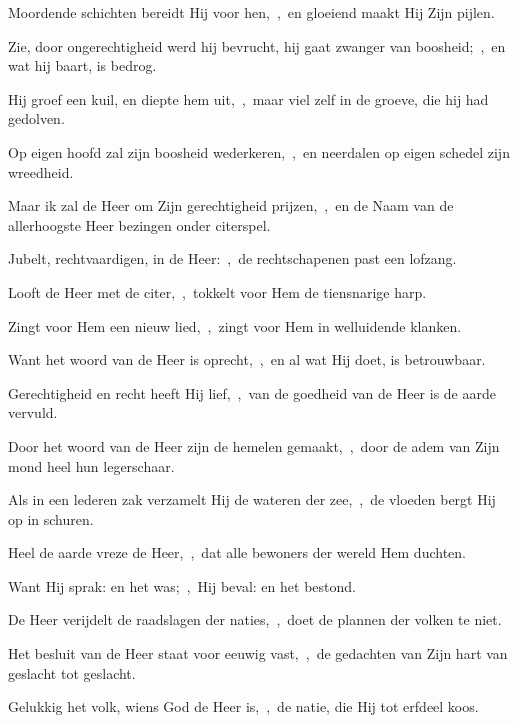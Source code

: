 \documentclass[12pt,twoside,a5paper]{article}
\begin{document}
\begin{halfparskip}
  Moordende schichten bereidt Hij voor hen,~\sep\ en gloeiend maakt Hij Zijn pijlen.

  Zie, door ongerechtigheid werd hij bevrucht, hij gaat zwanger van boosheid;~\sep\ en wat hij baart, is bedrog.

  Hij groef een kuil, en diepte hem uit,~\sep\ maar viel zelf in de groeve, die hij had gedolven.

  Op eigen hoofd zal zijn boosheid wederkeren,~\sep\ en neerdalen op eigen schedel zijn wreedheid.

  Maar ik zal de Heer om Zijn gerechtigheid prijzen,~\sep\ en de Naam van de allerhoogste Heer bezingen onder citerspel.
\end{halfparskip}

\begin{halfparskip}

   Jubelt, rechtvaardigen, in de Heer:~\sep\ de rechtschapenen past een lofzang.


  Looft de Heer met de citer,~\sep\ tokkelt voor Hem de tiensnarige harp.

  Zingt voor Hem een nieuw lied,~\sep\ zingt voor Hem in welluidende klanken.

  Want het woord van de Heer is oprecht,~\sep\ en al wat Hij doet, is betrouwbaar.

  Gerechtigheid en recht heeft Hij lief,~\sep\ van de goedheid van de Heer is de aarde vervuld.

  Door het woord van de Heer zijn de hemelen gemaakt,~\sep\ door de adem van Zijn mond heel hun legerschaar.

  Als in een lederen zak verzamelt Hij de wateren der zee,~\sep\ de vloeden bergt Hij op in schuren.

  Heel de aarde vreze de Heer,~\sep\ dat alle bewoners der wereld Hem duchten.

  Want Hij sprak: en het was;~\sep\ Hij beval: en het bestond.

  De Heer verijdelt de raadslagen der naties,~\sep\ doet de plannen der volken te niet.

  Het besluit van de Heer staat voor eeuwig vast,~\sep\ de gedachten van Zijn hart van geslacht tot geslacht.

  Gelukkig het volk, wiens God de Heer is,~\sep\ de natie, die Hij tot erfdeel koos.


\end{halfparskip}
\end{document}

